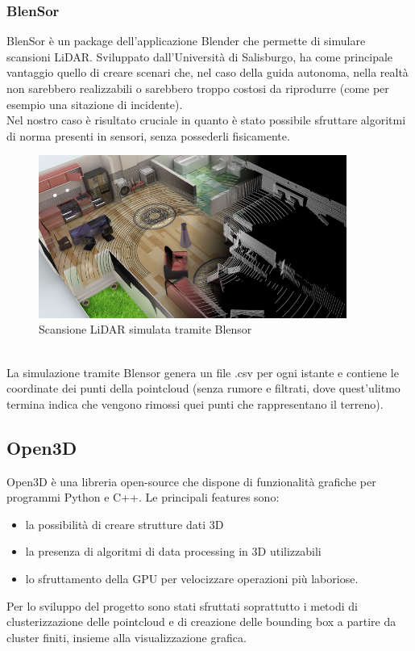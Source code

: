 \documentclass[italian]{article}
\begin{document}
\subsubsection{BlenSor}
BlenSor è un package dell'applicazione Blender che permette di simulare scansioni LiDAR. Sviluppato dall'Università di Salisburgo, ha come principale vantaggio quello di creare scenari che, nel caso della guida autonoma, nella realtà non sarebbero realizzabili o sarebbero troppo costosi da riprodurre (come per esempio una sitazione di incidente).\\
Nel nostro caso è risultato cruciale in quanto è stato possibile sfruttare algoritmi di norma presenti in sensori, senza possederli fisicamente.\\
\begin{figure}[H]
	\centering
	\includegraphics[width=0.9\textwidth]{Blensor}
	\footnotesize
	\caption{Scansione LiDAR simulata tramite Blensor}
\end{figure}\\
La simulazione tramite Blensor genera un file .csv per ogni istante e contiene le coordinate dei punti della pointcloud (senza rumore e filtrati, dove quest'ulitmo termina indica che vengono rimossi quei punti che rappresentano il terreno).
\subsection{Open3D}
Open3D è una libreria open-source che dispone di funzionalità grafiche per programmi Python e C++. Le principali features sono:
\begin{itemize}
	\item la possibilità di creare strutture dati 3D
	\item la presenza di algoritmi di data processing in 3D utilizzabili 
	\item lo sfruttamento della GPU per velocizzare operazioni più laboriose.
\end{itemize}
Per lo sviluppo del progetto sono stati sfruttati soprattutto i metodi di clusterizzazione delle pointcloud e di creazione delle bounding box a partire da cluster finiti, insieme alla visualizzazione grafica.
\end{document}
